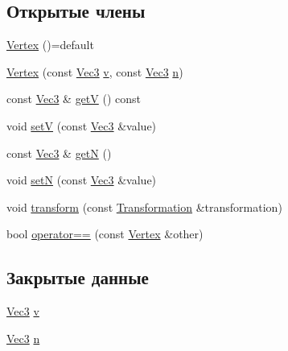 \subsection*{Открытые члены}
\begin{DoxyCompactItemize}
\item 
\hyperlink{class_vertex_ae2152b82b92f1522812a1e2bb8c32ba5}{Vertex} ()=default
\item 
\hyperlink{class_vertex_a7a9ca1b036b7786403085e35afc2efe3}{Vertex} (const \hyperlink{vec3_8h_a221ad8ea4d9be4111628ee1ca22ee3ba}{Vec3} \hyperlink{class_vertex_a74530e6e784db7cfa08df21c219f4b2b}{v}, const \hyperlink{vec3_8h_a221ad8ea4d9be4111628ee1ca22ee3ba}{Vec3} \hyperlink{class_vertex_ab747b8661900312711237a2e055f4058}{n})
\item 
const \hyperlink{vec3_8h_a221ad8ea4d9be4111628ee1ca22ee3ba}{Vec3} \& \hyperlink{class_vertex_ac923f6352efb5e3ad9458fd03931d00b}{getV} () const 
\item 
void \hyperlink{class_vertex_a556cc98768f4036f0f7f3458a0211468}{setV} (const \hyperlink{vec3_8h_a221ad8ea4d9be4111628ee1ca22ee3ba}{Vec3} \&value)
\item 
const \hyperlink{vec3_8h_a221ad8ea4d9be4111628ee1ca22ee3ba}{Vec3} \& \hyperlink{class_vertex_a65780983d9f9a29dc13b2099aa3f2996}{getN} ()
\item 
void \hyperlink{class_vertex_a471dd2fc5b33a6079c2142d6faad3a2c}{setN} (const \hyperlink{vec3_8h_a221ad8ea4d9be4111628ee1ca22ee3ba}{Vec3} \&value)
\item 
void \hyperlink{class_vertex_acf4d583092aa2bb904c03d378a0c966a}{transform} (const \hyperlink{class_transformation}{Transformation} \&transformation)
\item 
bool \hyperlink{class_vertex_af1ee0c4cbcbf0363ade89e95e2c74f9f}{operator==} (const \hyperlink{class_vertex}{Vertex} \&other)
\end{DoxyCompactItemize}
\subsection*{Закрытые данные}
\begin{DoxyCompactItemize}
\item 
\hyperlink{vec3_8h_a221ad8ea4d9be4111628ee1ca22ee3ba}{Vec3} \hyperlink{class_vertex_a74530e6e784db7cfa08df21c219f4b2b}{v}
\item 
\hyperlink{vec3_8h_a221ad8ea4d9be4111628ee1ca22ee3ba}{Vec3} \hyperlink{class_vertex_ab747b8661900312711237a2e055f4058}{n}
\end{DoxyCompactItemize}


